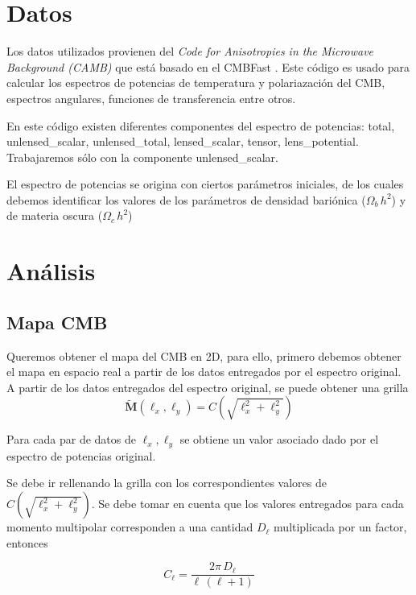 \documentclass[twocolumn,letterpaper,spanish]{revtex4}
\numberwithin{equation}{section}
\begin{document}
\section{Datos}\label{datos}

Los datos utilizados provienen del \textit{Code for Anisotropies in the Microwave Background (CAMB)} que est\'a basado en el CMBFast \citep{cmbfast}. Este c\'odigo es usado para calcular los espectros de potencias de temperatura y polariazaci\'on del CMB, espectros angulares, funciones de transferencia entre otros.

 En este c\'odigo existen diferentes componentes del espectro de potencias: total, unlensed\_scalar, unlensed\_total, lensed\_scalar, tensor, lens\_potential. Trabajaremos s\'olo con la componente unlensed\_scalar.

El espectro de potencias se origina con ciertos par\'ametros iniciales, de los cuales debemos identificar los valores de los par\'ametros de densidad bari\'onica ($\Omega_b\,h^2$) y de materia oscura ($\Omega_c\,h^2$)

\section{An\'alisis}\label{analisis}

\subsection{Mapa CMB}\label{mapa}

Queremos obtener el mapa del CMB en 2D, para ello, primero debemos obtener el mapa en espacio real a partir de los datos entregados por el espectro original.
A partir de los datos entregados del espectro original, se puede obtener una grilla 
\begin{equation}
\tilde{\mathbf{M}}(\ell_x,\ell_y)=C\left(\sqrt{\ell_x^2 + \ell_y^2}\right)
\end{equation}

Para cada par de datos de $\ell_x, \ell_y$ se obtiene un valor asociado dado por el espectro de potencias original.

Se debe ir rellenando la grilla con los correspondientes valores de $C(\sqrt{\ell_x^2 + \ell_y^2})$. Se debe tomar en cuenta que los valores entregados para cada momento multipolar corresponden a una cantidad $D_{\ell}$ multiplicada por un factor, entonces

\begin{equation}
C_{\ell} = \frac{2\pi\,D_{\ell}}{\ell\,(\ell+1)}
\end{equation}
\end{document}
